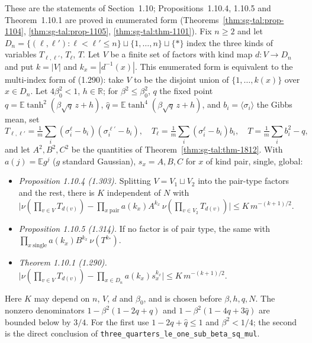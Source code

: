\begin{remark}
\label{rem:sg-tal:overlap-clt-statements}
These are the statements of Section~1.10; Propositions~1.10.4, 1.10.5 and Theorem~1.10.1 are proved in
enumerated form (Theorems~\ref{thm:sg-tal:prop-1104}, \ref{thm:sg-tal:prop-1105}, \ref{thm:sg-tal:thm-1101}).
Fix $n\ge2$ and let $D_n=\{(\ell,\ell'):\ell<\ell'\le n\}\sqcup\{1,\dots,n\}\sqcup\{*\}$ index the
three kinds of variables $T_{\ell,\ell'}$, $T_\ell$, $T$. Let $V$ be a finite set of factors
with kind map $d:V\to D_n$ and put $k=|V|$ and $k_x=|d^{-1}(x)|$. This enumerated form
is equivalent to the multi-index form of (1.290): take $V$ to be the disjoint union of
$\{1,\dots,k(x)\}$ over $x\in D_n$.
Let $4\beta_0^2<1$, $h\in\mathbb R$; for $\beta^2\le\beta_0^2$, $q$ the fixed point
$q=\mathbb E\tanh^2(\beta\sqrt q\,z+h)$, $\hat q=\mathbb E\tanh^4(\beta\sqrt q\,z+h)$,
and $b_i=\langle\sigma_i\rangle$ the Gibbs mean, set
\[
T_{\ell,\ell'}=\tfrac1m\sum_i(\sigma^\ell_i-b_i)(\sigma^{\ell'}_i-b_i),\quad
T_\ell=\tfrac1m\sum_i(\sigma^\ell_i-b_i)b_i,\quad T=\tfrac1m\sum_ib_i^2-q,
\]
and let $A^2,B^2,C^2$ be the quantities of Theorem~\ref{thm:sg-tal:thm-1812}.
With $a(j)=\mathbb E g^j$ ($g$ standard Gaussian), $s_x=A,B,C$ for $x$ of kind pair, single, global:
\begin{itemize}
\item \emph{Proposition 1.10.4 (1.303).} Splitting $V=V_1\sqcup V_2$ into the pair-type factors and the rest,
 there is $K$ independent of $N$ with
 $\big|\nu(\prod_{v\in V}T_{d(v)})-\prod_{x\ \mathrm{pair}}a(k_x)A^{k_x}\,\nu(\prod_{v\in V_2}T_{d(v)})\big|\le K\,m^{-(k+1)/2}$.
\item \emph{Proposition 1.10.5 (1.314).} If no factor is of pair type, the same with
 $\prod_{x\ \mathrm{single}}a(k_x)B^{k_x}\,\nu(T^{k_*})$.
\item \emph{Theorem 1.10.1 (1.290).} $\big|\nu(\prod_{v\in V}T_{d(v)})-\prod_{x\in D_n}a(k_x)s_x^{k_x}\big|\le K\,m^{-(k+1)/2}$.
\end{itemize}
Here $K$ may depend on $n$, $V$, $d$ and $\beta_0$, and is chosen before
$\beta,h,q,N$. The nonzero
denominators $1-\beta^2(1-2q+\hat q)$ and $1-\beta^2(1-4q+3\hat q)$ are bounded below by $3/4$.
For the first use $1-2q+\hat q\le1$ and $\beta^2<1/4$; the second is the direct conclusion of
\texttt{three\_quarters\_le\_one\_sub\_beta\_sq\_mul}.
\end{remark}

